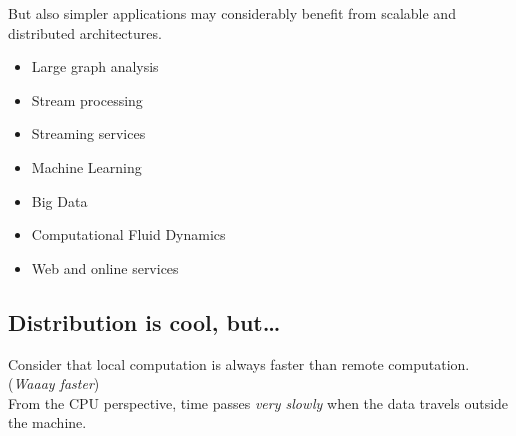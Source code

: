 
{But also simpler applications may considerably benefit from scalable and distributed architectures.\ns
\begin{itemize}
   \item Large graph analysis
   \item Stream processing
   \item Streaming services
   \item Machine Learning
   \item Big Data
   \item Computational Fluid Dynamics
   \item Web and online services
\end{itemize}}

\subsection{Distribution is cool, but\dots}
Consider that local computation is always faster than remote computation. (\textit{Waaay faster})\\
From the CPU perspective, time passes \textit{very slowly} when the data travels outside the machine.

